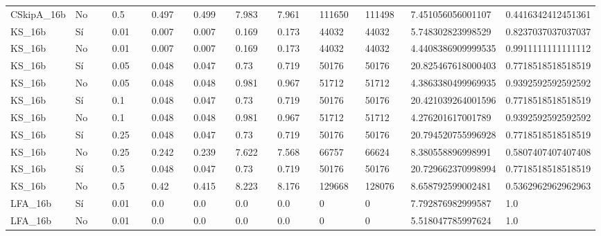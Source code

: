 {{\begin{longtable}{M{0.09\linewidth}M{0.09\linewidth}M{0.09\linewidth}M{0.09\linewidth}M{0.09\linewidth}M{0.09\linewidth}M{0.09\linewidth}M{0.09\linewidth}M{0.09\linewidth}M{0.09\linewidth}M{0.09\linewidth}}
CSkipA\_16b & No & \num{0.5} & \num{0.497} & \num{0.499} & \num{7.983} & \num{7.961} & \num{111650} & \num{111498} & \num{7.451056056001107} & \num{0.4416342412451361} \\
KS\_16b & Sí & \num{0.01} & \num{0.007} & \num{0.007} & \num{0.169} & \num{0.173} & \num{44032} & \num{44032} & \num{5.748302823998529} & \num{0.8237037037037037} \\
KS\_16b & No & \num{0.01} & \num{0.007} & \num{0.007} & \num{0.169} & \num{0.173} & \num{44032} & \num{44032} & \num{4.4408386909999535} & \num{0.9911111111111112} \\
KS\_16b & Sí & \num{0.05} & \num{0.048} & \num{0.047} & \num{0.73} & \num{0.719} & \num{50176} & \num{50176} & \num{20.825467618000403} & \num{0.7718518518518519} \\
KS\_16b & No & \num{0.05} & \num{0.048} & \num{0.048} & \num{0.981} & \num{0.967} & \num{51712} & \num{51712} & \num{4.3863380499969935} & \num{0.9392592592592592} \\
KS\_16b & Sí & \num{0.1} & \num{0.048} & \num{0.047} & \num{0.73} & \num{0.719} & \num{50176} & \num{50176} & \num{20.421039264001596} & \num{0.7718518518518519} \\
KS\_16b & No & \num{0.1} & \num{0.048} & \num{0.048} & \num{0.981} & \num{0.967} & \num{51712} & \num{51712} & \num{4.276201617001789} & \num{0.9392592592592592} \\
KS\_16b & Sí & \num{0.25} & \num{0.048} & \num{0.047} & \num{0.73} & \num{0.719} & \num{50176} & \num{50176} & \num{20.794520755996928} & \num{0.7718518518518519} \\
KS\_16b & No & \num{0.25} & \num{0.242} & \num{0.239} & \num{7.622} & \num{7.568} & \num{66757} & \num{66624} & \num{8.380558896998991} & \num{0.5807407407407408} \\
KS\_16b & Sí & \num{0.5} & \num{0.048} & \num{0.047} & \num{0.73} & \num{0.719} & \num{50176} & \num{50176} & \num{20.729662370998994} & \num{0.7718518518518519} \\
KS\_16b & No & \num{0.5} & \num{0.42} & \num{0.415} & \num{8.223} & \num{8.176} & \num{129668} & \num{128076} & \num{8.658792599002481} & \num{0.5362962962962963} \\
LFA\_16b & Sí & \num{0.01} & \num{0.0} & \num{0.0} & \num{0.0} & \num{0.0} & \num{0} & \num{0} & \num{7.792876982999587} & \num{1.0} \\
LFA\_16b & No & \num{0.01} & \num{0.0} & \num{0.0} & \num{0.0} & \num{0.0} & \num{0} & \num{0} & \num{5.518047785997624} & \num{1.0} \\

\end{longtable}}}
